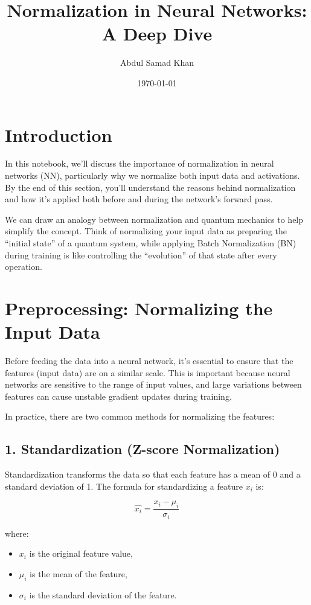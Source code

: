 \documentclass{article}
\title{Normalization in Neural Networks: A Deep Dive}
\author{Abdul Samad Khan}
\date{\today}
\begin{document}
\maketitle

\section*{Introduction}
In this notebook, we’ll discuss the importance of normalization in neural networks (NN), particularly why we normalize both input data and activations. By the end of this section, you’ll understand the reasons behind normalization and how it's applied both before and during the network's forward pass.

We can draw an analogy between normalization and quantum mechanics to help simplify the concept. Think of normalizing your input data as preparing the “initial state” of a quantum system, while applying Batch Normalization (BN) during training is like controlling the “evolution” of that state after every operation.

\section*{Preprocessing: Normalizing the Input Data}
Before feeding the data into a neural network, it’s essential to ensure that the features (input data) are on a similar scale. This is important because neural networks are sensitive to the range of input values, and large variations between features can cause unstable gradient updates during training.

In practice, there are two common methods for normalizing the features:

\subsection*{1. Standardization (Z-score Normalization)}
Standardization transforms the data so that each feature has a mean of 0 and a standard deviation of 1. The formula for standardizing a feature \(x_i\) is:

\[
\hat{x_i} = \frac{x_i - \mu_i}{\sigma_i}
\]

where:
\begin{itemize}
    \item \(x_i\) is the original feature value,
    \item \(\mu_i\) is the mean of the feature,
    \item \(\sigma_i\) is the standard deviation of the feature.
\end{itemize}
\end{document}
